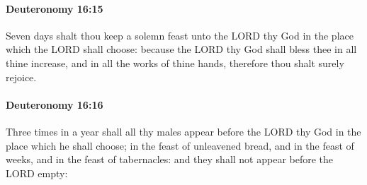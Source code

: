 		\paragraph{Deuteronomy 16:15} %
			\label{DEUTERONOMY-16-15}

			Seven days shalt thou keep a solemn feast unto the LORD thy God in the place which the LORD shall choose: because the LORD thy God shall bless thee in all thine increase, and in all the works of thine hands, therefore thou shalt surely rejoice.


		\paragraph{Deuteronomy 16:16} %
			\label{DEUTERONOMY-16-16}

			Three times in a year shall all thy males appear before the LORD thy God in the place which he shall choose; in the feast of unleavened bread, and in the feast of weeks, and in the feast of tabernacles: and they shall not appear before the LORD empty:


